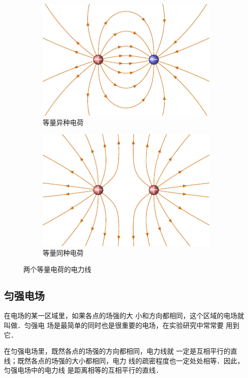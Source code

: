 \begin{figure}[htbp]
    \centering
    \begin{subfigure}{0.4\linewidth}
        \centering
        \includegraphics{fig/B/6-10a.pdf}
        \caption{等量异种电荷}\label{fig_B_6-10a}
    \end{subfigure}
    \hfil
    \begin{subfigure}{0.4\linewidth}
        \centering
        \includegraphics{fig/B/6-10b.pdf}
        \caption{等量同种电荷}\label{fig_B_6-10b}
    \end{subfigure}
    \caption{两个等量电荷的电力线}\label{fig_B_6-10}
\end{figure}
    


\subsection{匀强电场} 

在电场的某一区域里，如果各点的场强的大
小和方向都相同，这个区域的电场就叫做．匀强电
场是最简单的同时也是很重要的电场，在实验研究中常常要
用到它．

在匀强电场里，既然各点的场强的方向都相同，电力线就
一定是互相平行的直线；既然各点的场强的大小都相同，电力
线的疏密程度也一定处处相等．因此，匀强电场中的电力线
是距离相等的互相平行的直线．

